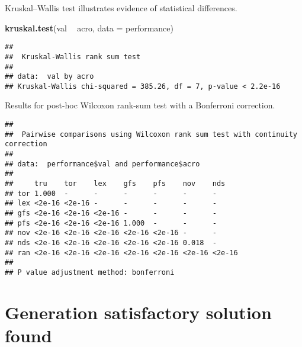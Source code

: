 \documentclass[]{book}
\newenvironment{Shaded}{\begin{snugshade}}{\end{snugshade}}
\newcommand{\DataTypeTok}[1]{\textcolor[rgb]{0.13,0.29,0.53}{#1}}
\newcommand{\KeywordTok}[1]{\textcolor[rgb]{0.13,0.29,0.53}{\textbf{#1}}}
\newcommand{\NormalTok}[1]{#1}
\newcommand{\OperatorTok}[1]{\textcolor[rgb]{0.81,0.36,0.00}{\textbf{#1}}}
\newcommand{\OtherTok}[1]{\textcolor[rgb]{0.56,0.35,0.01}{#1}}
\newcommand{\StringTok}[1]{\textcolor[rgb]{0.31,0.60,0.02}{#1}}
\begin{document}
Kruskal--Wallis test illustrates evidence of statistical differences.

\begin{Shaded}
\begin{Highlighting}[]
\KeywordTok{kruskal.test}\NormalTok{(val }\OperatorTok{~}\StringTok{ }\NormalTok{acro, }\DataTypeTok{data =}\NormalTok{ performance)}
\end{Highlighting}
\end{Shaded}

\begin{verbatim}
## 
##  Kruskal-Wallis rank sum test
## 
## data:  val by acro
## Kruskal-Wallis chi-squared = 385.26, df = 7, p-value < 2.2e-16
\end{verbatim}

Results for post-hoc Wilcoxon rank-sum test with a Bonferroni correction.

\begin{Shaded}
\end{Shaded}

\begin{verbatim}
## 
##  Pairwise comparisons using Wilcoxon rank sum test with continuity correction 
## 
## data:  performance$val and performance$acro 
## 
##     tru    tor    lex    gfs    pfs    nov    nds   
## tor 1.000  -      -      -      -      -      -     
## lex <2e-16 <2e-16 -      -      -      -      -     
## gfs <2e-16 <2e-16 <2e-16 -      -      -      -     
## pfs <2e-16 <2e-16 <2e-16 1.000  -      -      -     
## nov <2e-16 <2e-16 <2e-16 <2e-16 <2e-16 -      -     
## nds <2e-16 <2e-16 <2e-16 <2e-16 <2e-16 0.018  -     
## ran <2e-16 <2e-16 <2e-16 <2e-16 <2e-16 <2e-16 <2e-16
## 
## P value adjustment method: bonferroni
\end{verbatim}

\hypertarget{generation-satisfactory-solution-found}{%
\section{Generation satisfactory solution found}\label{generation-satisfactory-solution-found}}
\end{document}
